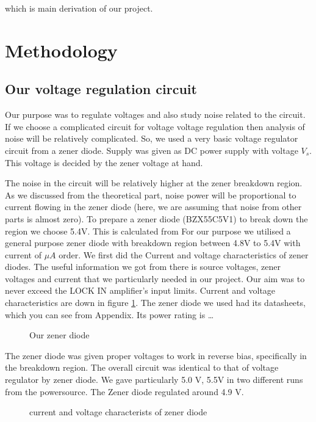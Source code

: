 \documentclass[12pt]{article}
\begin{document}
which is main derivation of our project.


\clearpage
\section{Methodology}\label{methodology}


\subsection{Our voltage regulation circuit}

Our purpose was to regulate voltages and also study noise related to the circuit. If we choose a complicated circuit for voltage voltage regulation then analysis of noise will be relatively complicated. So, we used a very basic voltage regulator circuit from a zener diode. Supply was given as DC power supply with voltage $V_{s}$. This voltage is decided by the zener voltage at hand.

The noise in the circuit will be relatively higher at the zener breakdown region. As we discussed from the theoretical part, noise power will be proportional to current flowing in the zener diode (here, we are assuming that noise from other parts is almost zero). To prepare a zener diode (BZX55C5V1) to break down the region we choose 5.4V. This is calculated from 
For our purpose we utilised a general purpose zener diode with breakdown region between 4.8V to 5.4V with current of $\mu A$ order. We first did the Current and voltage characteristics of zener diodes. The useful information we got from there is source voltages, zener voltages and current that we particularly needed in our project. Our aim was to never exceed the LOCK IN amplifier’s input limits. Current and voltage characteristics are down in figure \ref{exiv}. The zener diode we used had its datasheets, which you can see from Appendix. Its power rating is … 

\begin{figure}[hbt!]
\caption{Our zener diode}
\end{figure}

The zener diode was given proper voltages to work in reverse bias, specifically in the breakdown region. The overall circuit was identical to that of voltage regulator by zener diode. We gave particularly 5.0 V, 5.5V in two different runs from the powersource. The Zener diode regulated around 4.9 V. 

\begin{figure}[hbt!]
\caption{current and voltage characterists of zener diode \label{exiv}}
\end{figure}
\end{document}

